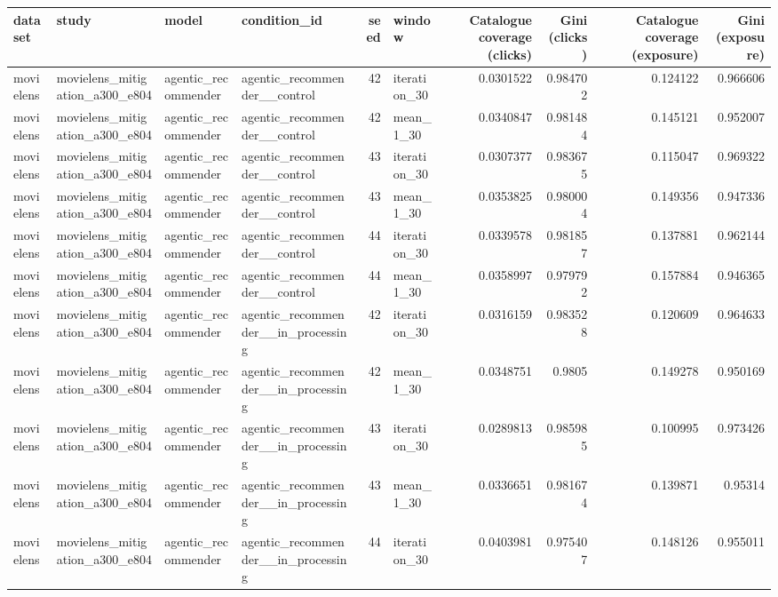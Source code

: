 \begin{table}[htbp!]
\centering
\small
\setlength{\tabcolsep}{3pt}
\renewcommand{\arraystretch}{1.1}
\begin{tabular}{llllrlrrrr}
\hline
dataset & study & model & condition\_id & seed & window & Catalogue coverage (clicks) & Gini (clicks) & Catalogue coverage (exposure) & Gini (exposure) \\
\hline
movielens & movielens\_mitigation\_a300\_e804 & agentic\_recommender & agentic\_recommender\_\_control & 42 & iteration\_30 & 0.0301522 & 0.984702 & 0.124122 & 0.966606 \\
movielens & movielens\_mitigation\_a300\_e804 & agentic\_recommender & agentic\_recommender\_\_control & 42 & mean\_1\_30 & 0.0340847 & 0.981484 & 0.145121 & 0.952007 \\
movielens & movielens\_mitigation\_a300\_e804 & agentic\_recommender & agentic\_recommender\_\_control & 43 & iteration\_30 & 0.0307377 & 0.983675 & 0.115047 & 0.969322 \\
movielens & movielens\_mitigation\_a300\_e804 & agentic\_recommender & agentic\_recommender\_\_control & 43 & mean\_1\_30 & 0.0353825 & 0.980004 & 0.149356 & 0.947336 \\
movielens & movielens\_mitigation\_a300\_e804 & agentic\_recommender & agentic\_recommender\_\_control & 44 & iteration\_30 & 0.0339578 & 0.981857 & 0.137881 & 0.962144 \\
movielens & movielens\_mitigation\_a300\_e804 & agentic\_recommender & agentic\_recommender\_\_control & 44 & mean\_1\_30 & 0.0358997 & 0.979792 & 0.157884 & 0.946365 \\
movielens & movielens\_mitigation\_a300\_e804 & agentic\_recommender & agentic\_recommender\_\_in\_processing & 42 & iteration\_30 & 0.0316159 & 0.983528 & 0.120609 & 0.964633 \\
movielens & movielens\_mitigation\_a300\_e804 & agentic\_recommender & agentic\_recommender\_\_in\_processing & 42 & mean\_1\_30 & 0.0348751 & 0.9805 & 0.149278 & 0.950169 \\
movielens & movielens\_mitigation\_a300\_e804 & agentic\_recommender & agentic\_recommender\_\_in\_processing & 43 & iteration\_30 & 0.0289813 & 0.985985 & 0.100995 & 0.973426 \\
movielens & movielens\_mitigation\_a300\_e804 & agentic\_recommender & agentic\_recommender\_\_in\_processing & 43 & mean\_1\_30 & 0.0336651 & 0.981674 & 0.139871 & 0.95314 \\
movielens & movielens\_mitigation\_a300\_e804 & agentic\_recommender & agentic\_recommender\_\_in\_processing & 44 & iteration\_30 & 0.0403981 & 0.975407 & 0.148126 & 0.955011 \\

\end{tabular}
\end{table}
